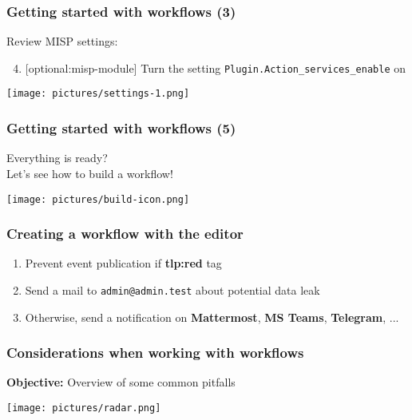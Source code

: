 \begin{frame}
    \frametitle{Getting started with workflows (3)}
    Review MISP settings:
    \begin{enumerate}
        \setcounter{enumi}{3}
        \item {[optional:misp-module]} Turn the setting \texttt{Plugin.Action\_services\_enable} on
    \end{enumerate}
    \begin{center}
        \texttt{[image: pictures/settings-1.png]}
    \end{center}
\end{frame}

\begin{frame}
    \frametitle{Getting started with workflows (5)}
    \centering
    {\Large Everything is ready?}\\
    \vspace*{3em}
    {\LARGE Let's see how to build a workflow!}
    \begin{center}
        \texttt{[image: pictures/build-icon.png]}
    \end{center}
\end{frame}

\begin{frame}
    \frametitle{Creating a workflow with the editor}
    \begin{enumerate}
        \item Prevent event publication if \textbf{tlp:red} tag
        \item Send a mail to \texttt{admin@admin.test} about potential data leak
        \item Otherwise, send a notification on \textbf{Mattermost}, \textbf{MS Teams}, \textbf{Telegram}, ...
    \end{enumerate}
\end{frame}

\begin{frame}
    \frametitle{
        \huge
        Considerations when working with workflows
        \vspace{1em}
    }
    \textbf{Objective:} Overview of some common pitfalls
    \begin{center}
        \texttt{[image: pictures/radar.png]}
    \end{center}
\end{frame}

